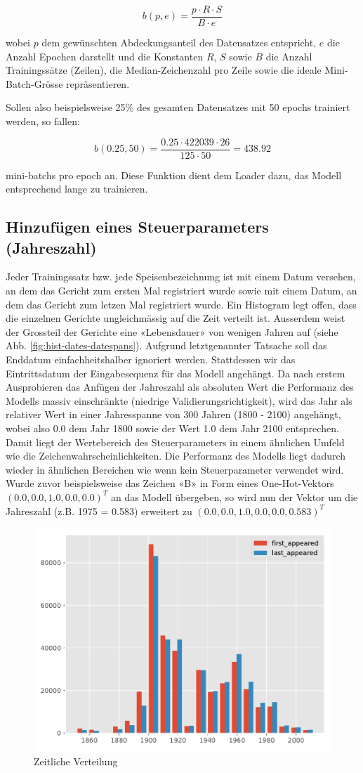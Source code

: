 \[ b(p, e) = \frac{p \cdot R \cdot S}{B \cdot e} \]

wobei $ p $ dem gewünschten Abdeckungsanteil des Datensatzes entspricht, $ e $ die Anzahl Epochen darstellt und die Konstanten $ R $, $ S $ sowie $ B $ die Anzahl Trainingssätze (Zeilen), die Median-Zeichenzahl pro Zeile sowie
die ideale Mini-Batch-Grösse repräsentieren.

Sollen also beispielsweise 25\% des gesamten Datensatzes mit 50 \glspl{epoch} trainiert werden, so fallen:

\[ b(0.25, 50) = \frac{0.25 \cdot 422039 \cdot 26}{125 \cdot 50} = 438.92 \]

\glspl{mini-batch} pro \gls{epoch} an.
Diese Funktion dient dem Loader dazu, das Modell entsprechend lange zu trainieren.

\subsection{Hinzufügen eines Steuerparameters (Jahreszahl)}
\label{subsec:adding-time-component}

Jeder Trainingssatz bzw. jede Speisenbezeichnung ist mit einem Datum versehen, an dem das Gericht zum ersten Mal
registriert wurde sowie mit einem Datum, an dem das Gericht zum letzen Mal registriert wurde.
Ein Histogram legt offen, dass die einzelnen Gerichte ungleichmässig auf die Zeit verteilt ist.
Ausserdem weist der Grossteil der Gerichte eine «Lebensdauer» von wenigen Jahren auf (siehe Abb. \ref{fig:hist-dates-datespans}).
Aufgrund letztgenannter Tatsache soll das Enddatum einfachheitshalber ignoriert werden.
Stattdessen wir das Eintrittsdatum der Eingabesequenz für das Modell angehängt.
Da nach erstem Ausprobieren das Anfügen der Jahreszahl als absoluten Wert die Performanz des Modells massiv einschränkte (niedrige Validierungsrichtigkeit), wird das Jahr
als relativer Wert in einer Jahresspanne von 300 Jahren (1800 - 2100) angehängt, wobei also 0.0 dem Jahr 1800 sowie der Wert 1.0 dem Jahr 2100 entsprechen.
Damit liegt der Wertebereich des Steuerparameters in einem ähnlichen Umfeld wie die Zeichenwahrscheinlichkeiten.
Die Performanz des Modells liegt dadurch wieder in ähnlichen Bereichen wie wenn kein Steuerparameter verwendet wird.
Wurde zuvor beispielsweise das Zeichen «B» in Form eines One-Hot-Vektors $ (0.0, 0.0, 1.0, 0.0, 0.0)^{T} $ an das Modell übergeben,
so wird nun der Vektor um die Jahreszahl (z.B. 1975 = 0.583) erweitert zu $ (0.0, 0.0, 1.0, 0.0, 0.0, 0.583)^{T} $

\begin{figure}
    \centering
    \includegraphics[width=0.75\linewidth]{images/analysis/histogram-dates.pdf}
    \caption{Zeitliche Verteilung}
    \label{fig:hist-dates-dates}
\end{figure}
